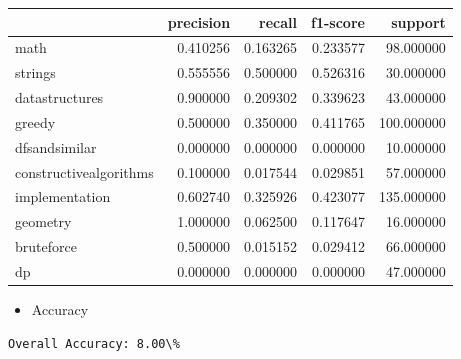 \documentclass{article}
\begin{document}
\begin{tabular}{lrrrr}
    \toprule
                           & precision & recall   & f1-score & support    \\
    \midrule
    math                   & 0.410256  & 0.163265 & 0.233577 & 98.000000  \\
    strings                & 0.555556  & 0.500000 & 0.526316 & 30.000000  \\
    datastructures         & 0.900000  & 0.209302 & 0.339623 & 43.000000  \\
    greedy                 & 0.500000  & 0.350000 & 0.411765 & 100.000000 \\
    dfsandsimilar          & 0.000000  & 0.000000 & 0.000000 & 10.000000  \\
    constructivealgorithms & 0.100000  & 0.017544 & 0.029851 & 57.000000  \\
    implementation         & 0.602740  & 0.325926 & 0.423077 & 135.000000 \\
    geometry               & 1.000000  & 0.062500 & 0.117647 & 16.000000  \\
    bruteforce             & 0.500000  & 0.015152 & 0.029412 & 66.000000  \\
    dp                     & 0.000000  & 0.000000 & 0.000000 & 47.000000  \\
    \bottomrule
\end{tabular}

\begin{itemize}
    \item Accuracy
\end{itemize}
\begin{verbatim}
Overall Accuracy: 8.00\%
\end{verbatim}
\end{document}
